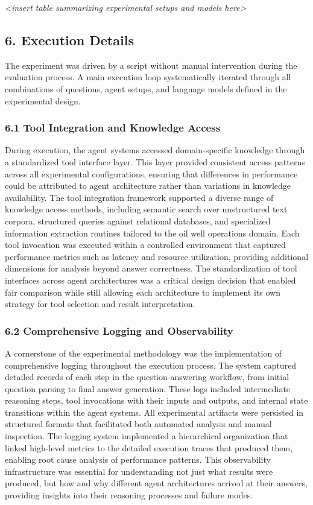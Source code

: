             \textit{<insert table summarizing experimental setups and models here>}

        \subsection{6. Execution Details}

            The experiment was driven by a script without manual intervention during the evaluation process. A main execution loop systematically iterated through all combinations of questions, agent setups, and language models defined in the experimental design. 

            \subsubsection{6.1 Tool Integration and Knowledge Access}

            During execution, the agent systems accessed domain-specific knowledge through a standardized tool interface layer. This layer provided consistent access patterns across all experimental configurations, ensuring that differences in performance could be attributed to agent architecture rather than variations in knowledge availability. The tool integration framework supported a diverse range of knowledge access methods, including semantic search over unstructured text corpora, structured queries against relational databases, and specialized information extraction routines tailored to the oil well operations domain. Each tool invocation was executed within a controlled environment that captured performance metrics such as latency and resource utilization, providing additional dimensions for analysis beyond answer correctness. The standardization of tool interfaces across agent architectures was a critical design decision that enabled fair comparison while still allowing each architecture to implement its own strategy for tool selection and result interpretation.

            \subsubsection{6.2 Comprehensive Logging and Observability}

            A cornerstone of the experimental methodology was the implementation of comprehensive logging throughout the execution process. The system captured detailed records of each step in the question-answering workflow, from initial question parsing to final answer generation. These logs included intermediate reasoning steps, tool invocations with their inputs and outputs, and internal state transitions within the agent systems. All experimental artifacts were persisted in structured formats that facilitated both automated analysis and manual inspection. The logging system implemented a hierarchical organization that linked high-level metrics to the detailed execution traces that produced them, enabling root cause analysis of performance patterns. This observability infrastructure was essential for understanding not just what results were produced, but how and why different agent architectures arrived at their answers, providing insights into their reasoning processes and failure modes.

